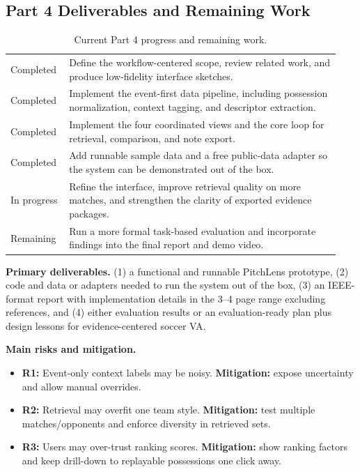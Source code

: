 \documentclass{vgtc}                          %
\begin{document}
\subsection{Part 4 Deliverables and Remaining Work}
\begin{table}[t]
\centering
\small
\caption{Current Part 4 progress and remaining work.}
\label{tab:progress}
\begin{tabular}{p{0.16\linewidth}p{0.78\linewidth}}
\hline
Completed & Define the workflow-centered scope, review related work, and produce low-fidelity interface sketches. \\
Completed & Implement the event-first data pipeline, including possession normalization, context tagging, and descriptor extraction. \\
Completed & Implement the four coordinated views and the core loop for retrieval, comparison, and note export. \\
Completed & Add runnable sample data and a free public-data adapter so the system can be demonstrated out of the box. \\
In progress & Refine the interface, improve retrieval quality on more matches, and strengthen the clarity of exported evidence packages. \\
Remaining & Run a more formal task-based evaluation and incorporate findings into the final report and demo video. \\
\hline
\end{tabular}
\end{table}

\noindent\textbf{Primary deliverables.}
(1) a functional and runnable PitchLens prototype, (2) code and data or adapters needed to run the system out of the box, (3) an IEEE-format report with implementation details in the 3--4 page range excluding references, and (4) either evaluation results or an evaluation-ready plan plus design lessons for evidence-centered soccer VA.

\noindent\textbf{Main risks and mitigation.}
\begin{itemize}[leftmargin=*]
\item \textbf{R1:} Event-only context labels may be noisy. \textbf{Mitigation:} expose uncertainty and allow manual overrides.
\item \textbf{R2:} Retrieval may overfit one team style. \textbf{Mitigation:} test multiple matches/opponents and enforce diversity in retrieved sets.
\item \textbf{R3:} Users may over-trust ranking scores. \textbf{Mitigation:} show ranking factors and keep drill-down to replayable possessions one click away.
\end{itemize}



\end{document}
